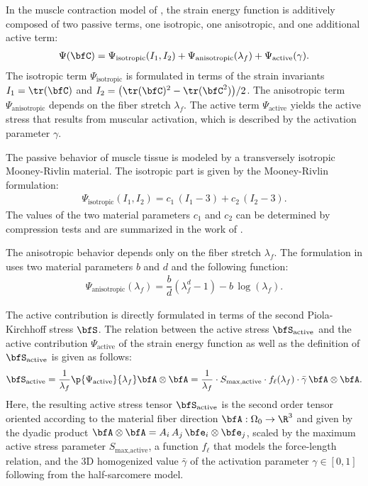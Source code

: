 In the muscle contraction model of \cite{Heidlauf2013}, the strain energy function is additively composed of two passive terms, one isotropic, one anisotropic, and one additional active term:
\begin{align*}
  \Psi(\bfC) = \Psi_\text{isotropic}(I_1,I_2) + \Psi_\text{anisotropic}(\lambda_f) + \Psi_\text{active}(\gamma).
\end{align*}
The isotropic term $\Psi_\text{isotropic}$ is formulated in terms of the strain invariants $I_1=\tr(\bfC)$ and $I_2=\big(\tr(\bfC)^2 - \tr(\bfC^2)\big)/2$. The anisotropic term $\Psi_\text{anisotropic}$ depends on the fiber stretch $\lambda_f$. The active term $\Psi_\text{active}$ yields the active stress that results from muscular activation, which is described by the activation parameter $\gamma$.

The passive behavior of muscle tissue is modeled by a transversely isotropic Mooney-Rivlin material.
The isotropic part is given by the Mooney-Rivlin formulation:%
\begin{align}\label{eq:mooney_rivlin}
  \Psi_\text{isotropic}(I_1,I_2) = c_1\,(I_1 - 3) + c_2\,(I_2-3).
\end{align}
The values of the two material parameters $c_1$ and $c_2$ can be determined by compression tests and are summarized in the work of \cite{Heidlauf2013}.

The anisotropic behavior depends only on the fiber stretch $\lambda_f$. The formulation in \cite{Heidlauf2013} uses two material parameters $b$ and $d$ and the following function:
\begin{align*}
  \Psi_\text{anisotropic}(\lambda_f) = \dfrac{b}{d}(\lambda_f^d - 1) - b\,\log(\lambda_f).
\end{align*}
%

The active contribution is directly formulated in terms of the second Piola-Kirchhoff stress $\bfS$. The relation between the active stress $\bfS_\text{active}$ and the active contribution $\Psi_\text{active}$ of the strain energy function as well as the definition of $\bfS_\text{active}$ is given as follows:
\begin{align}\label{eq:active_stress_term}
  \bfS_\text{active} = \dfrac{1}{\lambda_f}\p{\Psi_\text{active}}{\lambda_f} \bfA \otimes \bfA = \dfrac{1}{\lambda_f} \cdot S_\text{max,active}\cdot f_\ell(\lambda_f)\cdot\bar{\gamma}\, \bfA \otimes \bfA.
\end{align}
%
Here, the resulting active stress tensor $\bfS_\text{active}$ is the second order tensor oriented according to the material fiber direction $\bfA: \Omega_0 \to \R^3$ and given by the dyadic product $\bfA \otimes \bfA = A_{i}\,A_{j}\,\bfe_i \otimes \bfe_j$, scaled by the maximum active stress parameter $S_\text{max,active}$, a function $f_\ell$ that models the force-length relation, and the 3D homogenized value $\bar{\gamma}$ of the activation parameter $\gamma \in [0,1]$ following from the half-sarcomere model.


